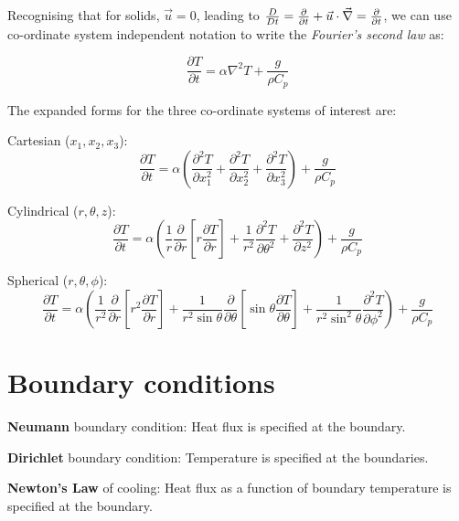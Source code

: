 Recognising that for solids, $\vec{u} = 0$, leading to $\frac{D}{Dt} = \frac{\partial}{\partial t} + \vec{u} \cdot \vec{\nabla} = \frac{\partial}{\partial t}$, we can use co-ordinate system independent notation to write the \textit{Fourier's second law} as:

\begin{equation}
\boxed{
\frac{\partial T}{\partial t}  = \alpha \nabla^2 T + \frac{g}{\rho C_p}
}
\label{fourier2b2}
\end{equation}

The expanded forms for the three co-ordinate systems of interest are:

Cartesian ($x_1,x_2,x_3$):
\begin{equation}
\frac{\partial T}{\partial t}  = \alpha \left( \frac{\partial^2 T}{\partial x_1^2} + \frac{\partial^2 T}{\partial x_2^2} + \frac{\partial^2 T}{\partial x_3^2}\right)  + \frac{g}{\rho C_p}
\end{equation}

Cylindrical ($r,\theta,z$):
\begin{equation}
\frac{\partial T}{\partial t}  = \alpha \left( \frac{1}{r} \frac{\partial}{\partial r} \left[ r \frac{\partial T}{\partial r} \right] + \frac{1}{r^2} \frac{\partial^2 T}{\partial \theta^2} + \frac{\partial^2 T}{\partial z^2}\right)  + \frac{g}{\rho C_p}
\end{equation}

Spherical ($r,\theta,\phi$):
\begin{equation}
\frac{\partial T}{\partial t} = \alpha \left( \frac{1}{r^2} \frac{\partial}{\partial r} \left[ r^2 \frac{\partial T}{\partial r} \right] + \frac{1}{r^2 \sin\theta} \frac{\partial}{\partial \theta} \left[ \sin\theta \frac{\partial T}{\partial \theta} \right] + \frac{1}{r^2 \sin^2 \theta} \frac{\partial^2 T}{\partial \phi^2}\right)  + \frac{g}{\rho C_p}
\end{equation}


\section{Boundary conditions}

\textbf{Neumann} boundary condition: Heat flux is specified at the boundary.

\textbf{Dirichlet} boundary condition: Temperature is specified at the boundaries.

\textbf{Newton's Law} of cooling: Heat flux as a function of boundary temperature is specified at the boundary. 

